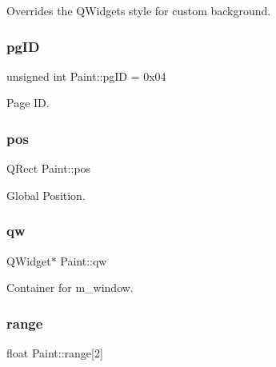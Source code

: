 Overrides the Q\+Widget\textquotesingle{}s style for custom background. 

\mbox{\label{classPaint_af6314388e667b01d9cd88e1d875d0449}} 
\subsubsection{\texorpdfstring{pgID}{pgID}}
{\footnotesize\ttfamily unsigned int Paint\+::pg\+ID = 0x04}



Page ID. 

\mbox{\label{classPaint_ad18245bd858cc8c6bd715e56659e3634}} 
\subsubsection{\texorpdfstring{pos}{pos}}
{\footnotesize\ttfamily Q\+Rect Paint\+::pos\hspace{0.3cm}{\ttfamily [private]}}



Global Position. 

\mbox{\label{classPaint_abaab9ddb4a329f78b558793a5f3a84c3}} 
\subsubsection{\texorpdfstring{qw}{qw}}
{\footnotesize\ttfamily Q\+Widget$\ast$ Paint\+::qw\hspace{0.3cm}{\ttfamily [private]}}



Container for m\+\_\+window. 

\mbox{\label{classPaint_a7c7236ff4eb95bce87e4700dbc3385eb}} 
\subsubsection{\texorpdfstring{range}{range}}
{\footnotesize\ttfamily float Paint\+::range\mbox{[}2\mbox{]}\hspace{0.3cm}{\ttfamily [private]}}



